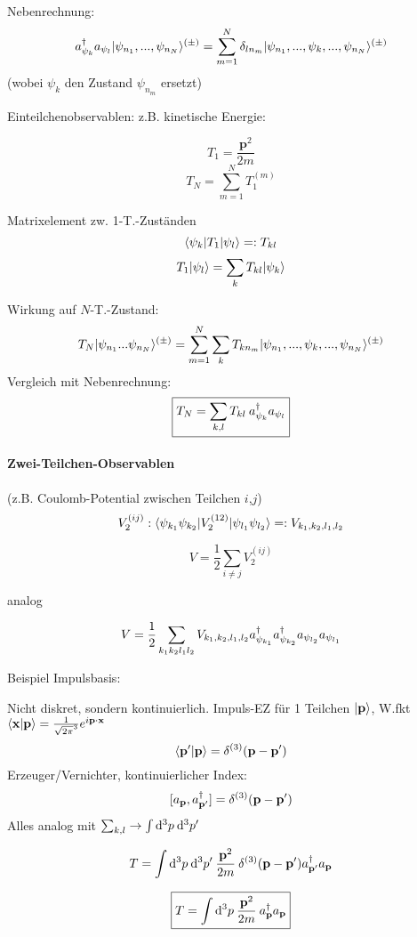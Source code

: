 \documentclass[11pt,a4paper]{report}
\renewcommand{\vec}{\boldsymbol}
\begin{document}
Nebenrechnung:
$$a_{\psi_{k}}^\dagger a_{\psi_{l}}|\psi_{n_1},...,\psi_{n_N}\rangle^{(\pm )}=\sum_{m=1}^N \delta_{ln_m}|\psi_{n_1},...,\psi_k,...,\psi_{n_N}\rangle^{(\pm )}$$
(wobei $\psi_k$ den Zustand $\psi_{n_m}$ ersetzt)\par 

Einteilchenobservablen: z.B. kinetische Energie:

$$T_1 = \frac{\vec{p}^2}{2m}$$
$$T_N = \sum_{m=1}^N T_1^{(m)}$$

Matrixelement zw. 1-T.-Zuständen
$$\langle \psi_k|T_1|\psi_l\rangle =: T_{kl}$$
$$T_1|\psi_l\rangle = \sum_k T_{kl}|\psi_k\rangle$$

Wirkung auf $N$-T.-Zustand:
$$T_N|\psi_{n_1}...\psi_{n_N}\rangle^{(\pm)} = \sum_{m=1}^N\sum_k T_{kn_m}|\psi_{n_1},...,\psi_k,...,\psi_{n_N}\rangle^{(\pm )}$$
Vergleich mit Nebenrechnung:
$$\boxed{T_N = \sum_{k,l}T_{kl}\:a_{\psi_{k}}^\dagger a_{\psi_{l}}}$$

\paragraph{Zwei-Teilchen-Observablen} (z.B. Coulomb-Potential zwischen Teilchen $i$,$j$)
$$V_2^{(ij)} : \langle \psi_{k_1}\psi_{k_2}|V_2^{(12)}|\psi_{l_1}\psi_{l_2}\rangle=: V_{k_1,k_2,l_1,l_2}$$

$$V = \frac{1}{2}\sum_{i\neq j} V_2^{(ij)}$$

analog

$$V = \frac{1}{2}\sum_{k_1k_2l_1l_2} V_{k_1,k_2,l_1,l_2}a_{\psi_{k_1}}^\dagger a_{\psi_{k_2}}^\dagger a_{\psi_{l_2}}a_{\psi_{l_1}}$$

Beispiel Impulsbasis:\par 

Nicht diskret, sondern kontinuierlich. Impuls-EZ für 1 Teilchen $|\mathbf{p}\rangle$, W.fkt $\langle \mathbf{x} | \mathbf{p} \rangle=\frac{1}{\sqrt{2\pi}^3}e^{i\mathbf{p}\cdot\mathbf{x}}$
$$\langle \mathbf{p}' | \mathbf{p} \rangle = \delta^{(3)}(\mathbf{p}-\mathbf{p}')$$
Erzeuger/Vernichter, kontinuierlicher Index:
$$[a_{\mathbf{p}},a_{\mathbf{p}'}^\dagger]=\delta^{(3)}(\mathbf{p}-\mathbf{p}')$$
Alles analog mit $\sum_{k,l} \rightarrow \int\mathrm{d}^3p\:\mathrm{d}^3p'$

$$T = \int \mathrm{d}^3p\:\mathrm{d}^3p' \: \frac{\mathbf{p}^2}{2m}\: \delta^{(3)}(\mathbf{p}-\mathbf{p}') a_{\mathbf{p}'}^\dagger a_{\mathbf{p}}$$

$$\boxed{T=\int\mathrm{d}^3p \: \frac{\mathbf{p}^2}{2m} \:a_{\mathbf{p}}^\dagger a_{\mathbf{p}}}$$
\end{document}
